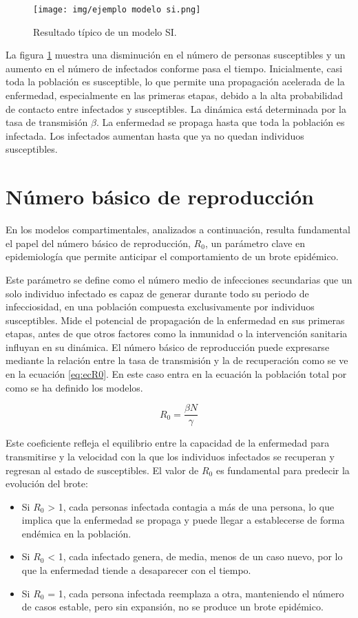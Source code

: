 \begin{figure}[H]
    \centering
    \texttt{[image: img/ejemplo modelo si.png]}
    \caption{Resultado típico de un modelo SI.}
    \label{fig:ejemplo SI}
   
\end{figure}

La figura \ref{fig:ejemplo SI} muestra una disminución en el número de personas susceptibles y un aumento en el número de infectados conforme pasa el tiempo. Inicialmente, casi toda la población es susceptible, lo que permite una propagación acelerada de la enfermedad, especialmente en las primeras etapas, debido a la alta probabilidad de contacto entre infectados y susceptibles.
La dinámica está determinada por la tasa de transmisión $\beta$.
La enfermedad se propaga hasta que toda la población es infectada. Los infectados aumentan hasta que ya no quedan individuos susceptibles.


\section{Número básico de reproducción}
En los modelos compartimentales, analizados a continuación, resulta fundamental el papel del número básico de reproducción, $R_0$, un parámetro clave en epidemiología que permite anticipar el comportamiento de un brote epidémico.

Este parámetro se define como el número medio de infecciones secundarias que un solo individuo infectado es capaz de generar durante todo su periodo de infecciosidad, en una población compuesta exclusivamente por individuos susceptibles. Mide el potencial de propagación de la enfermedad en sus primeras etapas, antes de que otros factores como la inmunidad o la intervención sanitaria influyan en su dinámica.
El número básico de reproducción puede expresarse mediante la relación entre la tasa de transmisión y la de recuperación como se ve en la ecuación \ref{eq:ecR0}. En este caso entra en la ecuación la población total por como se ha definido los modelos.

\begin{equation}
R_0 = \frac{\beta N}{\gamma}
\label{eq:ecR0}
\end{equation}

Este coeficiente refleja el equilibrio entre la capacidad de la enfermedad para transmitirse y la velocidad con la que los individuos infectados se recuperan y regresan al estado de susceptibles. 
El valor de $R_0$ es fundamental para predecir la evolución del brote:
\begin{itemize}
    \item Si $R_0$ > 1, cada personas infectada contagia a más de una persona, lo que implica que la enfermedad se propaga y puede llegar a establecerse de forma endémica en la población.
    \item Si $R_0$ < 1, cada infectado genera, de media, menos de un caso nuevo, por lo que la enfermedad tiende a desaparecer con el tiempo.
    \item Si $R_0$ = 1, cada persona infectada reemplaza a otra, manteniendo el número de casos estable, pero sin expansión, no se produce un brote epidémico.
\end{itemize}
	
